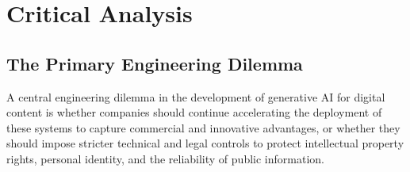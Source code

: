 


















\newpage
\section{Critical Analysis}

\subsection{The Primary Engineering Dilemma}
A central engineering dilemma in the development of generative AI for digital content is whether companies should continue accelerating the deployment of these systems to capture commercial and innovative advantages, or whether they should impose stricter technical and legal controls to protect intellectual property rights, personal identity, and the reliability of public information. \\


